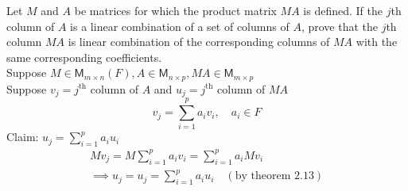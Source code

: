 Let $M$ and $A$ be matrices for which the product matrix $MA$ is
defined. If the $j$th column of $A$ is a linear combination of a set
of columns of $A$, prove that the $j$th column $MA$ is linear
combination of the corresponding columns of $MA$ with the same
corresponding coefficients.
\\Suppose $M \in \mathsf{M}_{m\times n}(F), A \in \mathsf{M}_{n\times p}, MA \in \mathsf{M}_{m\times p}$
\\Suppose $v_j = j^{\text{th}}$ column of $A$ and $u_j = j^{\text{th}}$ column of $MA$
\begin{equation}
v_j = \sum\limits_{i=1}^p a_iv_i, \quad a_i\in F
\end{equation}
Claim: $ u_j = \sum\limits_{i=1}^p a_iu_i$
\begin{gather}
Mv_j = M\sum\limits_{i=1}^p a_iv_i = \sum\limits_{i=1}^p a_iMv_i\\
\implies u_j = u_j = \sum\limits_{i=1}^p a_iu_i \quad (\text{by
  theorem 2.13})
\end{gather}

